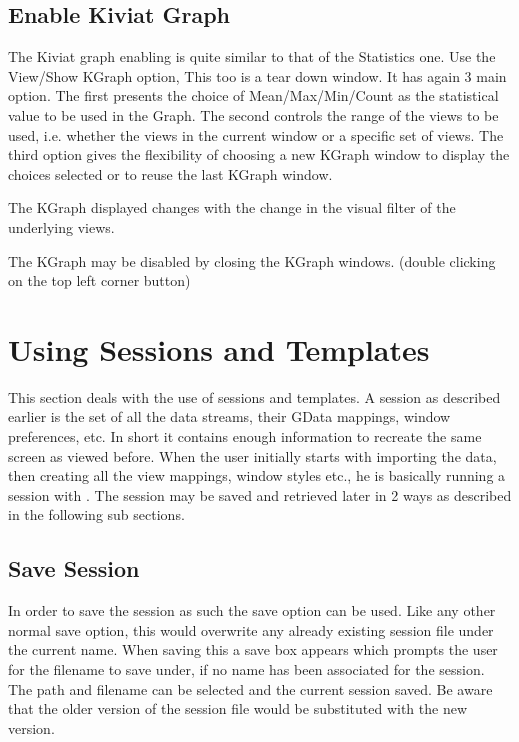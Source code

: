 \subsection{Enable Kiviat Graph}

The Kiviat graph enabling is quite similar to that of the Statistics
one. Use the View/Show KGraph option, This too is a tear down
window. It has again 3 main option. The first presents the choice of
Mean/Max/Min/Count as the statistical value to be used in the
Graph. The second controls the range of the views to be used,
i.e. whether the views in the current window or a specific set of
views.  The third option gives the flexibility of choosing a new
KGraph window to display the choices selected or to reuse the last
KGraph window.

The KGraph displayed changes with the change in the visual filter of
the underlying views.

The KGraph may be disabled by closing the KGraph windows. (double
clicking on the top left corner button)

\section{Using Sessions and Templates}

This section deals with the use of sessions and templates. A session
as described earlier is the set of all the data streams, their GData
mappings, window preferences, etc. In short it contains enough
information to recreate the same screen as viewed before. When the
user initially starts with importing the data, then creating all the
view mappings, window styles etc., he is basically running a session
with \Devise. The session may be saved and retrieved later in 2 ways as
described in the following sub sections.

\subsection{Save Session}

In order to save the session as such the save option can be used. Like
any other normal save option, this would overwrite any already
existing session file under the current name. When saving this a save
box appears which prompts the user for the filename to save under, if
no name has been associated for the session. The path and filename can
be selected and the current session saved. Be aware that the older
version of the session file would be substituted with the new version.

